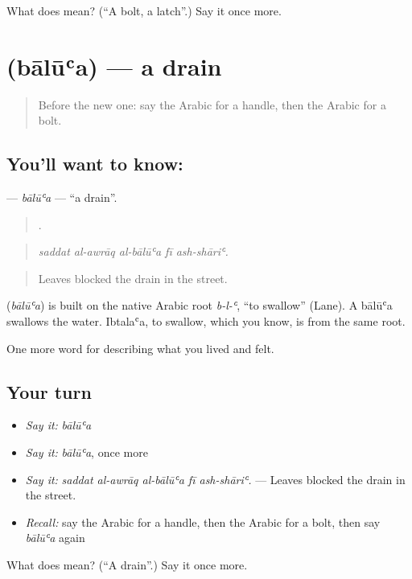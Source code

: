 \begin{tcolorbox}[breakable,colback=teal!4,colframe=teal!35!black,title={Before you move on}]
What does  mean? (\textquotedblleft{}A bolt, a latch\textquotedblright{}.) Say it once more.
\end{tcolorbox}
\section[\texorpdfstring{\ar{بالوعة} (bālūʿa)}{بالوعة (bālūʿa)}]{ (bālūʿa) — a drain}

\label{lesson:AR-C549-balua}



\begin{quote}
Before the new one: say the Arabic for a handle, then the Arabic for a bolt.
\end{quote}

\subsection*{You'll want to know: }
\textbf{} — \emph{bālūʿa} — \textquotedblleft{}a drain\textquotedblright{}.

\begin{quote}
    .
\end{quote}

\begin{quote}
\emph{saddat al-awrāq al-bālūʿa fī ash-shāriʿ.}
\end{quote}

\begin{quote}
Leaves blocked the drain in the street.
\end{quote}

\begin{cousinweb}
\textbf{} (\emph{bālūʿa}) is built on the native Arabic root \emph{b-l-ʿ}, \textquotedblleft{}to swallow\textquotedblright{} (Lane). A bālūʿa swallows the water. Ibtalaʿa, to swallow, which you know, is from the same root.
\end{cousinweb}

\begin{grammarlens}[title={What you've built}]
One more word for describing what you lived and felt.
\end{grammarlens}

\subsection*{Your turn}
\begin{itemize}
\raggedright
  \item \emph{Say it:} \emph{bālūʿa}
  \item \emph{Say it:} \emph{bālūʿa}, once more
  \item \emph{Say it:} \emph{saddat al-awrāq al-bālūʿa fī ash-shāriʿ.} — Leaves blocked the drain in the street.
  \item \emph{Recall:} say the Arabic for a handle, then the Arabic for a bolt, then say \emph{bālūʿa} again
\end{itemize}

\begin{tcolorbox}[breakable,colback=teal!4,colframe=teal!35!black,title={Before you move on}]
What does  mean? (\textquotedblleft{}A drain\textquotedblright{}.) Say it once more.
\end{tcolorbox}
